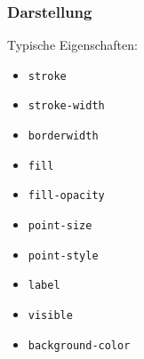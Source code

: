 \documentclass[11pt]{beamer}
\begin{document}
\begin{frame}
	\frametitle{Darstellung}
	Typische Eigenschaften:
	\begin{itemize}
		\item \texttt{stroke}
		\item \texttt{stroke-width}
		\item \texttt{borderwidth}
		\item \texttt{fill}
		\item \texttt{fill-opacity}
		\item \texttt{point-size}
		\item \texttt{point-style}
		\item \texttt{label}
		\item \texttt{visible}
		\item \texttt{background-color}
	\end{itemize}
\end{frame}
\end{document}
